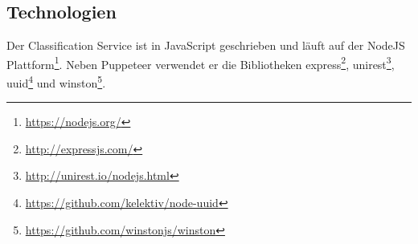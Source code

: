 \subsection{Technologien}
    Der Classification Service ist in JavaScript geschrieben und läuft auf der
    NodeJS Plattform\footnote{\url{https://nodejs.org/}}.
    Neben Puppeteer verwendet er die Bibliotheken
    express\footnote{\url{http://expressjs.com/}},
    unirest\footnote{\url{http://unirest.io/nodejs.html}},
    uuid\footnote{\url{https://github.com/kelektiv/node-uuid}}
    und winston\footnote{\url{https://github.com/winstonjs/winston}}.